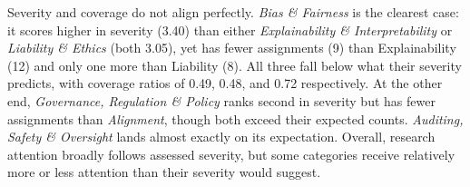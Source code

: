 	Severity and coverage do not align perfectly. \emph{Bias \& Fairness} is the clearest case: it scores higher in severity (3.40) than either \emph{Explainability \& Interpretability} or \emph{Liability \& Ethics} (both 3.05), yet has fewer assignments (9) than Explainability (12) and only one more than Liability (8). All three fall below what their severity predicts, with coverage ratios of 0.49, 0.48, and 0.72 respectively. At the other end, \emph{Governance, Regulation \& Policy} ranks second in severity but has fewer assignments than \emph{Alignment}, though both exceed their expected counts. \emph{Auditing, Safety \& Oversight} lands almost exactly on its expectation. Overall, research attention broadly follows assessed severity, but some categories receive relatively more or less attention than their severity would suggest.
		
	


